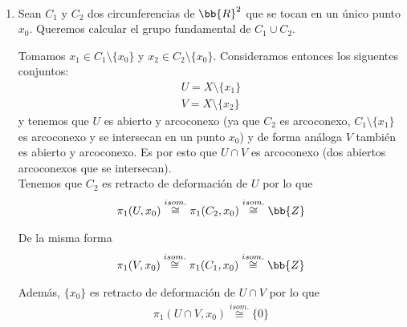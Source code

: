 \begin{ejemplo}\
    \begin{enumerate}
        \item Sean $C_1$ y $C_2$ dos circunferencias de $\bb{R}^2$ que se tocan en un único punto $x_0$. Queremos calcular el grupo fundamental de $C_1\cup C_2$.
        
        \begin{figure}[H]
            \centering
        \end{figure}

        Tomamos $x_1\in C_1\setminus\{x_0\}$ y $x_2\in C_2 \setminus \{x_0\}$. Consideramos entonces los siguentes conjuntos:
        \begin{gather*}
            U=X\setminus \{x_1\} \\
            V = X \setminus \{x_2\}
        \end{gather*}
        y tenemos que $U$ es abierto y arcoconexo (ya que $C_2$ es arcoconexo, $C_1\setminus \{x_1\}$ es arcoconexo y se intersecan en un punto $x_0$) y de forma análoga $V$ también es abierto y arcoconexo. Es por esto que $U\cap V$ es arcoconexo (dos abiertos arcoconexos que se intersecan).\\

        Tenemos que $C_2$ es retracto de deformación de $U$ por lo que
        \begin{gather*}
            \pi_1(U,x_0) \overset{isom.}{\cong} \pi_1(C_2,x_0) \overset{isom.}{\cong} \bb{Z}
        \end{gather*}

        De la misma forma 
        \begin{gather*}
            \pi_1(V,x_0) \overset{isom.}{\cong} \pi_1(C_1,x_0) \overset{isom.}{\cong} \bb{Z}
        \end{gather*}

        Además, $\{x_0\}$ es retracto de deformación de $U\cap V$ por lo que 
        \begin{gather*}
            \pi_1(U\cap V,x_0) \overset{isom.}{\cong} \{0\}
        \end{gather*}


\end{enumerate}
\end{ejemplo}

